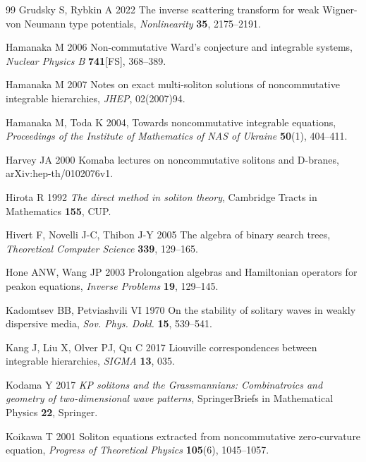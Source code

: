 \documentclass[5p,twocolumn]{elsarticle}
\begin{document}
\begin{thebibliography}{99}
 Grudsky S, Rybkin A 2022 The inverse scattering transform for weak Wigner-von Neumann type potentials, \textit{Nonlinearity} \textbf{35}, 2175--2191.  

 Hamanaka M 2006 Non-commutative Ward's conjecture and integrable systems, \textit{Nuclear Physics B} \textbf{741}[FS], 368--389.
  
 Hamanaka M 2007 Notes on exact multi-soliton solutions of noncommutative integrable hierarchies, \textit{JHEP}, 02(2007)94.
  
 Hamanaka M, Toda K 2004, Towards noncommutative integrable equations, \textit{Proceedings of the Institute of Mathematics of NAS of Ukraine} \textbf{50}(1), 404--411.

 Harvey JA 2000 Komaba lectures on noncommutative solitons and D-branes, arXiv:hep-th/0102076v1.

 Hirota R 1992 \textit{The direct method in soliton theory}, Cambridge Tracts in Mathematics \textbf{155}, CUP.

 Hivert F, Novelli J-C, Thibon J-Y 2005 The algebra of binary search trees, \textit{Theoretical Computer Science} \textbf{339}, 129--165.

 Hone ANW, Wang JP 2003 Prolongation algebras and Hamiltonian operators for peakon equations, \textit{Inverse Problems} \textbf{19}, 129--145.
  
 Kadomtsev BB, Petviashvili VI 1970 On the stability of solitary waves in weakly dispersive media, \textit{Sov. Phys. Dokl.\/} \textbf{15}, 539--541. 

 Kang J, Liu X, Olver PJ, Qu C 2017 Liouville correspondences between integrable hierarchies, \textit{SIGMA} \textbf{13}, 035.
  

 Kodama Y 2017 \emph{KP solitons and the Grassmannians: Combinatroics and geometry of two-dimensional wave patterns}, SpringerBriefs in Mathematical Physics \textbf{22}, Springer.

 Koikawa T 2001 Soliton equations extracted from noncommutative zero-curvature equation, \textit{Progress of Theoretical Physics} \textbf{105}(6), 1045--1057. 
  

\end{thebibliography}
\end{document}
